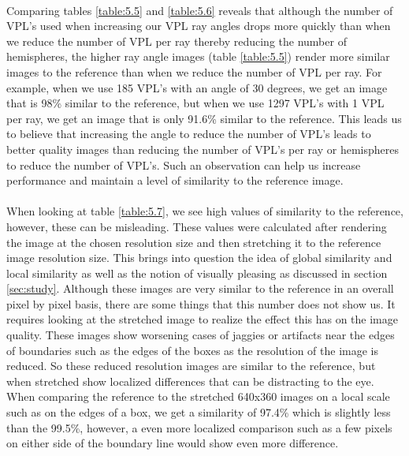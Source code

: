 \paragraph{}
Comparing tables \ref{table:5.5} and \ref{table:5.6} reveals that although the number of VPL's used when increasing our VPL ray angles drops more quickly than when we reduce the number of VPL per ray thereby reducing the number of hemispheres, the higher ray angle images (table \ref{table:5.5}) render more similar images to the reference than when we reduce the number of VPL per ray.  For example, when we use 185 VPL's with an angle of 30 degrees, we get an image that is 98\% similar to the reference, but when we use 1297 VPL's with 1 VPL per ray, we get an image that is only 91.6\% similar to the reference.  This leads us to believe that increasing the angle to reduce the number of VPL's leads to better quality images than reducing the number of VPL's per ray or hemispheres to reduce the number of VPL's.  Such an observation can help us increase performance and maintain a level of similarity to the reference image.

\paragraph{}
When looking at table \ref{table:5.7}, we see high values of similarity to the reference, however, these can be misleading.  These values were calculated after rendering the image at the chosen resolution size and then stretching it to the reference image resolution size.  This brings into question the idea of global similarity and local similarity as well as the notion of visually pleasing as discussed in section \ref{sec:study}.  Although these images are very similar to the reference in an overall pixel by pixel basis, there are some things that this number does not show us.  It requires looking at the stretched image to realize the effect this has on the image quality.  These images show worsening cases of jaggies or artifacts near the edges of boundaries such as the edges of the boxes as the resolution of the image is reduced.  So these reduced resolution images are similar to the reference, but when stretched show localized differences that can be distracting to the eye.  When comparing the reference to the stretched 640x360 images on a local scale such as on the edges of a box, we get a similarity of 97.4\% which is slightly less than the 99.5\%, however, a even more localized comparison such as a few pixels on either side of the boundary line would show even more difference.

